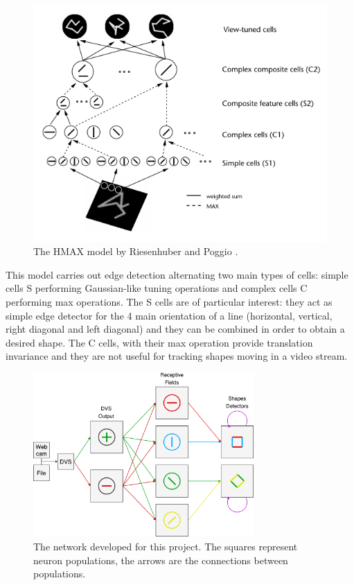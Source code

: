 \begin{figure}[ht]
\centering
\includegraphics[scale=0.5]{images/development/hmax.png}
\caption[HMAX Model]{The HMAX model by Riesenhuber and Poggio \cite{Riesenhuber1999}.}
\label{fig:hmax}
\end{figure}

This model carries out edge detection alternating two main types of cells: simple cells \textsc{S} performing Gaussian-like tuning operations and complex cells \textsc{C} performing max operations. The \textsc{S} cells are of particular interest: they act as simple edge detector for the 4 main orientation of a line (horizontal, vertical, right diagonal and left diagonal) and they can be combined in order to obtain a desired shape. The \textsc{C} cells, with their max operation provide translation invariance and they are not useful for tracking shapes moving in a video stream.

\begin{figure}[ht]
\centering
\includegraphics[width=0.75\textwidth]{images/development/network.png}
\caption[Network Overview]{The network developed for this project. The squares represent neuron populations, the arrows are the connections between populations.}
\label{fig:network}
\end{figure}


